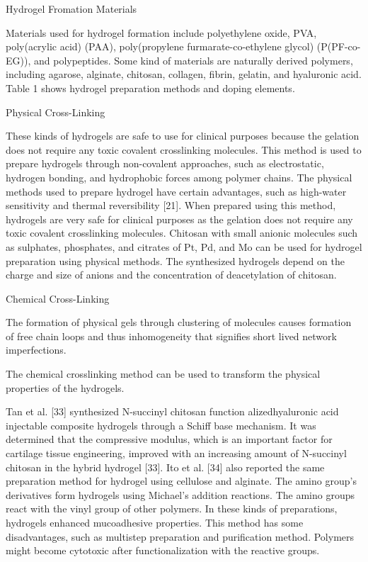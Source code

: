 \documentclass[../../main-notes.tex]{subfiles}
\begin{document}
Hydrogel Fromation Materials

Materials used for hydrogel formation include polyethylene oxide, PVA, poly(acrylic acid) (PAA), poly(propylene furmarate-co-ethylene glycol) (P(PF-co-EG)), and polypeptides. 
Some kind of materials are naturally derived polymers, including agarose, alginate, chitosan, collagen, fibrin, gelatin, and hyaluronic acid. 
Table 1 shows hydrogel preparation methods and doping elements.

Physical Cross-Linking

These kinds of hydrogels are safe to use for clinical purposes because the gelation does not require any toxic covalent crosslinking molecules. 
This method is used to prepare hydrogels through non-covalent approaches, such as electrostatic, hydrogen bonding, and hydrophobic forces among polymer chains. 
The physical methods used to prepare hydrogel have certain advantages, such as high-water sensitivity and thermal reversibility [21]. 
When prepared using this method, hydrogels are very safe for clinical purposes as the gelation does not require any toxic covalent crosslinking molecules. 
Chitosan with small anionic molecules such as sulphates, phosphates, and citrates of Pt, Pd, and Mo can be used for hydrogel preparation using physical methods. 
The synthesized hydrogels depend on the charge and size of anions and the concentration of deacetylation of chitosan.


Chemical Cross-Linking

The formation of physical gels through clustering of molecules causes formation of free chain loops and thus inhomogeneity that signifies short lived network imperfections. 

The chemical crosslinking method can be used to transform the physical properties of the hydrogels. 

 
Tan et al. [33] synthesized N-succinyl chitosan function alizedhyaluronic acid injectable composite hydrogels through a Schiff base mechanism. 
It was determined that the compressive modulus, which is an important factor for cartilage tissue engineering, improved with an increasing amount of N-succinyl chitosan in the hybrid hydrogel [33]. 
Ito et al. [34] also reported the same preparation method for hydrogel using cellulose and alginate. The amino group’s derivatives form hydrogels using Michael’s addition reactions. 
The amino groups react with the vinyl group of other polymers. 
In these kinds of preparations, hydrogels enhanced mucoadhesive properties. This method has some disadvantages, such as multistep preparation and purification method. Polymers might become cytotoxic after functionalization with the reactive groups.
\end{document}
